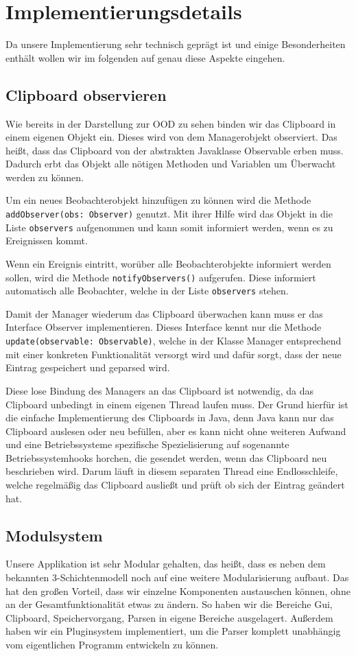 \documentclass[a4paper,11pt,abstracton,titlepage]{scrartcl}
\begin{document}
\section{Implementierungsdetails}
Da unsere Implementierung sehr technisch geprägt ist und einige Besonderheiten
enthält wollen wir im folgenden auf genau diese Aspekte eingehen.

\subsection{Clipboard observieren}
Wie bereits in der Darstellung zur OOD zu sehen binden wir das Clipboard in
einem eigenen Objekt ein. Dieses wird von dem Managerobjekt observiert. Das
heißt, dass das Clipboard von der abstrakten Javaklasse Observable erben muss.
Dadurch erbt das Objekt alle nötigen Methoden und Variablen um Überwacht werden
zu können. 

Um ein neues Beobachterobjekt hinzufügen zu können wird die Methode
\texttt{addObserver(obs: Observer)} genutzt. Mit ihrer Hilfe wird das Objekt in
die Liste \texttt{observers} aufgenommen und kann somit informiert werden, wenn
es zu Ereignissen kommt. 

Wenn ein Ereignis eintritt, worüber alle Beobachterobjekte informiert werden
sollen, wird die Methode \texttt{notifyObservers()} aufgerufen. Diese informiert
automatisch alle Beobachter, welche in der Liste \texttt{observers} stehen.

Damit der Manager wiederum das Clipboard überwachen kann muss er das Interface
Observer implementieren. Dieses Interface kennt nur die Methode
\texttt{update(observable: Observable)}, welche in der Klasse Manager
entsprechend mit einer konkreten Funktionalität versorgt wird und dafür sorgt,
dass der neue Eintrag gespeichert und geparsed wird.

Diese lose Bindung des Managers an das Clipboard ist notwendig, da das Clipboard
unbedingt in einem eigenen Thread laufen muss. Der Grund hierfür ist die
einfache Implementierung des Clipboards in Java, denn Java kann nur das
Clipboard auslesen oder neu befüllen, aber es kann nicht ohne weiteren Aufwand
und eine Betriebssysteme spezifische Spezielisierung auf sogenannte
Betriebssystemhooks horchen, die gesendet werden, wenn das Clipboard neu
beschrieben wird. Darum läuft in diesem separaten Thread eine Endlosschleife,
welche regelmäßig das Clipboard ausließt und prüft ob sich der Eintrag geändert
hat.

\subsection{Modulsystem}
Unsere Applikation ist sehr Modular gehalten, das heißt, dass es neben dem
bekannten 3-Schichtenmodell noch auf eine weitere Modularisierung aufbaut.
Das hat den großen Vorteil, dass wir einzelne Komponenten austauschen können,
ohne an der Gesamtfunktionalität etwas zu ändern. So haben wir die Bereiche Gui,
Clipboard, Speichervorgang, Parsen in eigene Bereiche ausgelagert. Außerdem
haben wir ein Pluginsystem implementiert, um die Parser komplett unabhängig vom
eigentlichen Programm entwickeln zu können.
\end{document}
